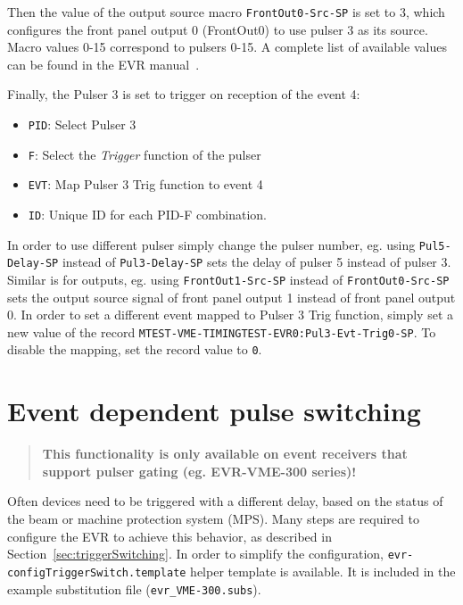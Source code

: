 \documentclass[12pt,a4paper]{article}
\begin{document}
Then the value of the output source macro \texttt{FrontOut0-Src-SP} is set to 3, which configures the front panel output 0 (FrontOut0) to use pulser 3 as its source. Macro values 0-15 correspond to pulsers 0-15. A complete list of available values can be found in the EVR manual~\cite{evr_manual}.

Finally, the Pulser 3 is set to trigger on reception of the event 4:
\begin{itemize}
	\item \texttt{PID}: Select Pulser 3
	\item \texttt{F}: Select the \textit{Trigger} function of the pulser
	\item \texttt{EVT}: Map Pulser 3 Trig function to event 4
	\item \texttt{ID}: Unique ID for each PID-F combination.
\end{itemize}

In order to use different pulser simply change the pulser number, eg. using \texttt{Pul5-Delay-SP} instead of \texttt{Pul3-Delay-SP} sets the delay of pulser 5 instead of pulser 3.
Similar is for outputs, eg. using \texttt{FrontOut1-Src-SP} instead of \texttt{FrontOut0-Src-SP} sets the output source signal of front panel output 1 instead of front panel output 0. In order to set a different event mapped to Pulser 3 Trig function, simply set a new value of the record \texttt{MTEST-VME-TIMINGTEST-EVR0:Pul3-Evt-Trig0-SP}. To disable the mapping, set the record value to \texttt{0}.

\section{Event dependent pulse switching}\label{sec:2pulsers}
\begin{quote}
\textbf{This functionality is only available on event receivers that support pulser gating (eg. EVR-VME-300 series)!}
\end{quote}
Often devices need to be triggered with a different delay, based on the status of the beam or machine protection system (MPS). Many steps are required to configure the EVR to achieve this behavior, as described in Section~\ref{sec:triggerSwitching}. In order to simplify the configuration, \texttt{evr-configTriggerSwitch.template} helper template is available. It is included in the example substitution file (\texttt{evr\_VME-300.subs}).%
\end{document}
